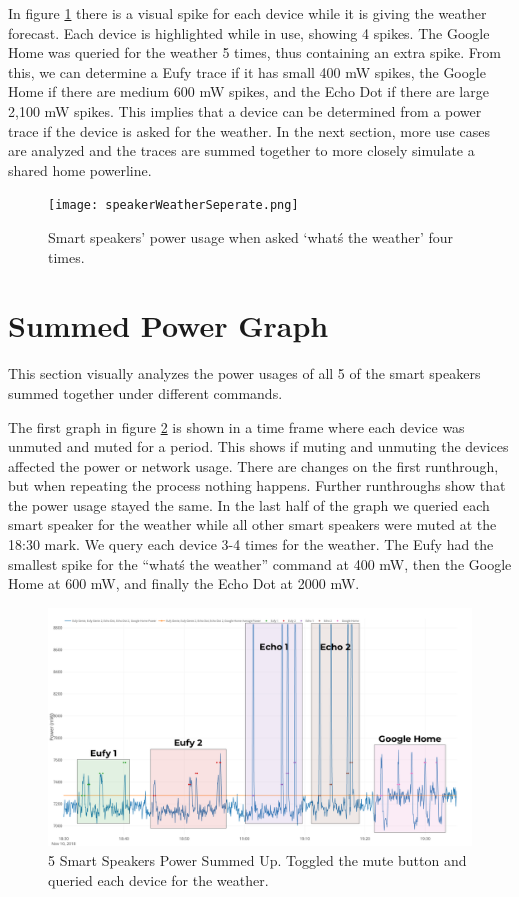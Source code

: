 In figure \ref{fig:speakerWeatherSeperate} there is a visual spike for each device while it is giving the weather forecast. Each device is highlighted while in use, showing 4 spikes. The Google Home was queried for the weather 5 times, thus containing an extra spike. From this, we can determine a Eufy trace if it has small 400 mW spikes, the Google Home if there are medium 600 mW spikes, and the Echo Dot if there are large 2,100 mW spikes. This implies that a device can be determined from a power trace if the device is asked for the weather. In the next section, more use cases are analyzed and the traces are summed together to more closely simulate a shared home powerline.

\begin{figure}[H]
    \centering
    \texttt{[image: speakerWeatherSeperate.png]}
    \caption{Smart speakers' power usage when asked `what\'s the weather' four times.}
    \label{fig:speakerWeatherSeperate}
\end{figure}

\section{Summed Power Graph}
\label{sumPowerGraph}
This section visually analyzes the power usages of all 5 of the smart speakers summed together under different commands.

The first graph in figure \ref{fig:weatherSum} is shown in a time frame where each device was unmuted and muted for a period. This shows if muting and unmuting the devices affected the power or network usage. There are changes on the first runthrough, but when repeating the process nothing happens. Further runthroughs show that the power usage stayed the same. In the last half of the graph we queried each smart speaker for the weather while all other smart speakers were muted at the 18:30 mark. We query each device 3-4 times for the weather. The Eufy had the smallest spike for the ``what\'s the weather'' command at 400 mW, then the Google Home at 600 mW, and finally the Echo Dot at 2000 mW.

\begin{figure}[H]
  \centering
  \includegraphics[width=1\textwidth]{figures/weatherSum.png}
  \caption{5 Smart Speakers Power Summed Up. Toggled the mute button and queried each device for the weather.}
  \label{fig:weatherSum}
\end{figure}

